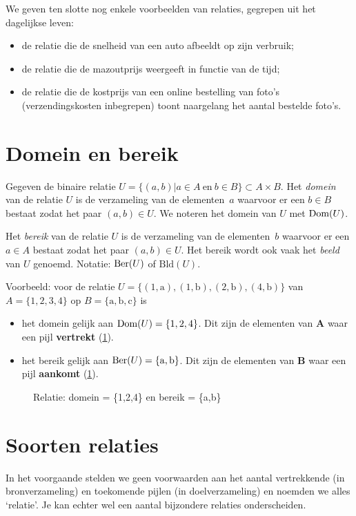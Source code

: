 We geven ten slotte nog enkele voorbeelden van relaties, gegrepen uit het dagelijkse leven:
\begin{itemize}
\item de relatie die de snelheid van een auto afbeeldt op zijn verbruik;
\item de relatie die de mazoutprijs weergeeft in functie van de tijd;
\item de relatie die de kostprijs van een online bestelling van foto's (verzendingskosten inbegrepen) toont naargelang het aantal bestelde foto's.
\end{itemize}

\section{Domein en bereik}
\label{sec:domeinBereik}
Gegeven de binaire relatie $U=\{({a},{b})|{a}\in A \mathrm{~ en~} {b} \in B\}\subset A \times B$. 
Het \emph{domein} van de relatie $U$ is de verzameling van de elementen~${a}$ waarvoor er een $b\in B$ 
bestaat zodat het paar $({a},{b})\in U$. We noteren het domein van $U$ met $\text{Dom}(U)$.

Het \emph{bereik} van de relatie $U$ is de verzameling van de elementen~${b}$
waarvoor er een $a\in A$ bestaat zodat het paar $({a},{b})\in U$. Het bereik wordt ook vaak het \emph{beeld} van $U$ genoemd.
Notatie: $\text{Ber}(U)$ of $\text{Bld}(U)$.

Voorbeeld: voor de relatie $U=\{(1,\mathrm{a}),(1,\mathrm{b}),(2,\mathrm{b}),(4,\mathrm{b}) \}$ van $A=\{1,2,3,4\}$ op $B=\{\mathrm{a},\mathrm{b},\mathrm{c} \}$ is 
\begin{itemize}
\item het domein gelijk aan $\text{Dom}(U)=\{1,2,4\}$. Dit zijn de elementen van $\mathbf{A}$ waar een pijl \textbf{vertrekt} (\cref{fig:dombereik}).
\item het bereik gelijk aan $\text{Ber}(U)=\{ \mathrm{a},\mathrm{b}\}$. Dit zijn de elementen van $\mathbf{B}$ waar een pijl \textbf{aankomt} (\cref{fig:dombereik}).
\end{itemize}

\begin{figure}[htbp]
\centering

\caption{Relatie: domein = \{1,2,4\} en bereik = \{a,b\}}
\label{fig:dombereik}
\end{figure}


\section{Soorten relaties} \label{subsec:soortenrelaties}
In het voorgaande stelden we geen voorwaarden aan het aantal vertrekkende (in bronverzameling) en toekomende pijlen (in doelverzameling) en noemden we alles `relatie'. Je kan echter wel een aantal bijzondere relaties onderscheiden. 

